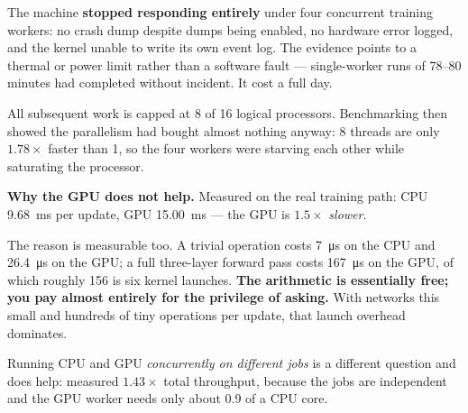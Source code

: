 \begin{trap}
The machine \textbf{stopped responding entirely} under four concurrent training
workers: no crash dump despite dumps being enabled, no hardware error logged, and
the kernel unable to write its own event log. The evidence points to a thermal or
power limit rather than a software fault --- single-worker runs of 78--80 minutes
had completed without incident. It cost a full day.

All subsequent work is capped at 8 of 16 logical processors. Benchmarking then
showed the parallelism had bought almost nothing anyway: 8 threads are only
$1.78\times$ faster than 1, so the four workers were starving each other while
saturating the processor.
\end{trap}

\begin{why}
\textbf{Why the GPU does not help.} Measured on the real training path: CPU
\SI{9.68}{\milli\second} per update, GPU \SI{15.00}{\milli\second} --- the GPU is
$1.5\times$ \emph{slower}.

The reason is measurable too. A trivial operation costs \SI{7}{\micro\second} on
the CPU and \SI{26.4}{\micro\second} on the GPU; a full three-layer forward pass
costs \SI{167}{\micro\second} on the GPU, of which roughly \SI{156}{} is six
kernel launches. \textbf{The arithmetic is essentially free; you pay almost
entirely for the privilege of asking.} With networks this small and hundreds of
tiny operations per update, that launch overhead dominates.

Running CPU and GPU \emph{concurrently on different jobs} is a different question
and does help: measured $1.43\times$ total throughput, because the jobs are
independent and the GPU worker needs only about 0.9 of a CPU core.
\end{why}
